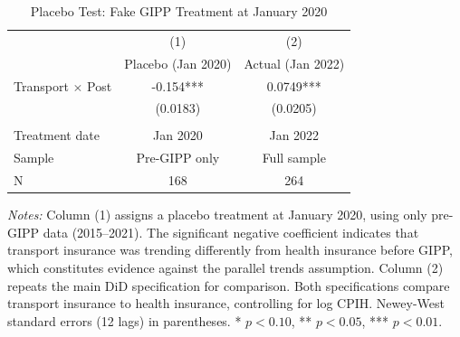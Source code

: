 \begin{table}[H]
\centering
\caption{Placebo Test: Fake GIPP Treatment at January 2020}
\label{tab:placebo}
\begin{threeparttable}
\begin{tabular}{lcc}
\toprule
 & (1) & (2) \\
 & Placebo (Jan 2020) & Actual (Jan 2022) \\
\midrule
Transport $\times$ Post & -0.154*** & 0.0749*** \\
 & (0.0183) & (0.0205) \\
\\
Treatment date & Jan 2020 & Jan 2022 \\
Sample & Pre-GIPP only & Full sample \\
N & 168 & 264 \\
\bottomrule
\end{tabular}
\begin{tablenotes}[flushleft]
\small
\item \textit{Notes:} Column (1) assigns a placebo treatment at January 2020, using only pre-GIPP data (2015--2021). The significant negative coefficient indicates that transport insurance was trending differently from health insurance before GIPP, which constitutes evidence against the parallel trends assumption. Column (2) repeats the main DiD specification for comparison. Both specifications compare transport insurance to health insurance, controlling for log CPIH. Newey-West standard errors (12 lags) in parentheses. * $p<0.10$, ** $p<0.05$, *** $p<0.01$.
\end{tablenotes}
\end{threeparttable}
\end{table}
